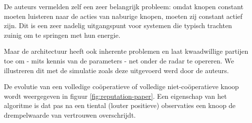De auteurs vermelden zelf een zeer belangrijk probleem: omdat knopen constant
moeten luisteren naar de acties van naburige knopen, moeten zij constant actief
zijn. Dit is een zeer nadelig uitgangspunt voor systemen die typisch trachten
zuinig om te springen met hun energie.

Maar de architectuur heeft ook inherente problemen en laat kwaadwillige
partijen toe om - mits kennis van de parameters - net onder de radar te
opereren. We illustreren dit met de simulatie zoals deze uitgevoerd werd door
de auteurs.

De evolutie van een volledige co\"operatieve of volledige niet-co\"operatieve
knoop wordt weergegeven in figuur \ref{fig:reputation-paper}. Een eigenschap
van het algoritme is dat pas na een tiental (louter positieve) observaties een
knoop de drempelwaarde van vertrouwen overschrijdt.

